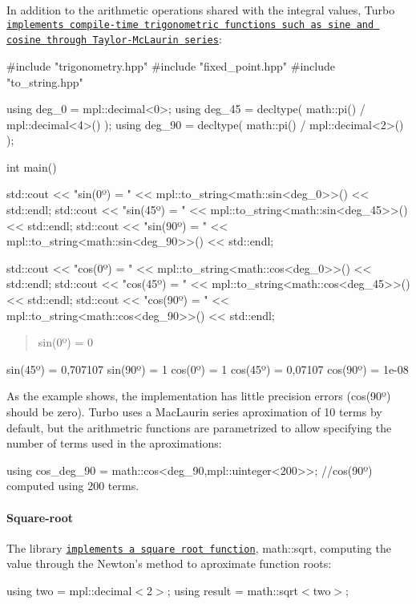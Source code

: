 In addition to the arithmetic operations shared with the integral values, Turbo \href{https://github.com/Manu343726/Turbo/blob/dynamic_fixed_point/trigonometry.hpp}{\tt implements compile-\/time trigonometric functions such as sine and cosine through Taylor-\/\+Mc\+Laurin series}\+: \begin{DoxyVerb}#include "trigonometry.hpp"
#include "fixed_point.hpp"
#include "to_string.hpp"

using deg_0 = mpl::decimal<0>;
using deg_45 = decltype( math::pi() / mpl::decimal<4>() );
using deg_90 = decltype( math::pi() / mpl::decimal<2>() );

int main()
{
  std::cout << "sin(0º) = "  << mpl::to_string<math::sin<deg_0>>() << std::endl;
  std::cout << "sin(45º) = " << mpl::to_string<math::sin<deg_45>>() << std::endl;
  std::cout << "sin(90º) = " << mpl::to_string<math::sin<deg_90>>() << std::endl;

  std::cout << "cos(0º) = "  << mpl::to_string<math::cos<deg_0>>() << std::endl;
  std::cout << "cos(45º) = " << mpl::to_string<math::cos<deg_45>>() << std::endl;
  std::cout << "cos(90º) = " << mpl::to_string<math::cos<deg_90>>() << std::endl;
}
\end{DoxyVerb}
 \begin{quote}
sin(0º) = 0 \end{quote}
sin(45º) = 0,707107 sin(90º) = 1 cos(0º) = 1 cos(45º) = 0,07107 cos(90º) = 1e-\/08

As the example shows, the implementation has little precision errors ({\ttfamily cos(90º)} should be zero). Turbo uses a Mac\+Laurin series aproximation of 10 terms by default, but the arithmetric functions are parametrized to allow specifying the number of terms used in the aproximations\+: \begin{DoxyVerb}using cos_deg_90 = math::cos<deg_90,mpl::uinteger<200>>; //cos(90º) computed using 200 terms. 
\end{DoxyVerb}


\paragraph*{Square-\/root}

The library \href{https://github.com/Manu343726/Turbo/blob/dynamic_fixed_point/sqrt.hpp}{\tt implements a square root function}, {\ttfamily math\+::sqrt}, computing the value through the Newton's method to aproximate function roots\+:

using two = mpl\+::decimal$<$2$>$; using result = math\+::sqrt$<$two$>$;

